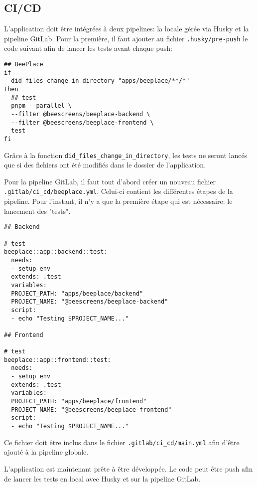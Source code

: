 \subsection{CI/CD}

L'application doit être intégrées à deux pipelines: la locale gérée via Husky et la pipeline GitLab. Pour la première, il faut ajouter au fichier \texttt{.husky/pre-push} le code suivant afin de lancer les tests avant chaque push:

\begin{verbatim}
## BeePlace
if
  did_files_change_in_directory "apps/beeplace/**/*"
then
  ## test
  pnpm --parallel \
  --filter @beescreens/beeplace-backend \
  --filter @beescreens/beeplace-frontend \
  test
fi
\end{verbatim}

Grâce à la fonction \texttt{did_files_change_in_directory}, les tests ne seront lancés que si des fichiers ont été modifiés dans le dossier de l'application.

Pour la pipeline GitLab, il faut tout d'abord créer un nouveau fichier \texttt{.gitlab/ci_cd/beeplace.yml}. Celui-ci contient les différentes étapes de la pipeline. Pour l'instant, il n'y a que la première étape qui est nécessaire: le lancement des "tests".

\begin{verbatim}
## Backend

# test
beeplace::app::backend::test:
  needs:
  - setup env
  extends: .test
  variables:
  PROJECT_PATH: "apps/beeplace/backend"
  PROJECT_NAME: "@beescreens/beeplace-backend"
  script:
  - echo "Testing $PROJECT_NAME..."

## Frontend

# test
beeplace::app::frontend::test:
  needs:
  - setup env
  extends: .test
  variables:
  PROJECT_PATH: "apps/beeplace/frontend"
  PROJECT_NAME: "@beescreens/beeplace-frontend"
  script:
  - echo "Testing $PROJECT_NAME..."
\end{verbatim}

Ce fichier doit être inclus dans le fichier \texttt{.gitlab/ci_cd/main.yml} afin d'être ajouté à la pipeline globale.

L'application est maintenant prête à être développée. Le code peut être push afin de lancer les tests en local avec Husky et sur la pipeline GitLab.